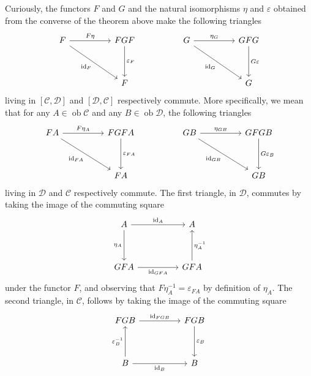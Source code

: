 \documentclass[a4paper,11pt]{article}
\theoremstyle{break_italics}
\theoremstyle{break_upright}
\theoremstyle{remark}
\newcommand{\id}{\mathrm{id}}
\newcommand{\ob}{\operatorname{ob}}
\newcommand{\C}{\mathcal{C}}
\newcommand{\D}{\mathcal{D}}
\begin{document}
Curiously, the functors $F$ and $G$ and the natural isomorphisms $\eta$ and $\varepsilon$ obtained from the converse of the theorem above make the following triangles
\[
\begin{tikzcd}
F \arrow[rr, "F\eta"] \arrow[rrdd, "\id_F"'] &  & FGF \arrow[dd, "\varepsilon_F"] &  & G \arrow[rr, "\eta_G"] \arrow[rrdd, "\id_G"'] &  & GFG \arrow[dd, "G\varepsilon"] \\
                                             &  &                                 &  &                                               &  &                                \\
                                             &  & F                               &  &                                               &  & G                             
\end{tikzcd}
\]
living in $[\C,\D]$ and $[\D,\C]$ respectively commute. More specifically, we mean that for any $A \in \ob\C$ and any $B \in \ob\D$, the following triangles
\[
\begin{tikzcd}
FA \arrow[rr, "F\eta_A"] \arrow[rrdd, "\id_{FA}"'] &  & FGFA \arrow[dd, "\varepsilon_{FA}"] &  & GB \arrow[rr, "\eta_{GB}"] \arrow[rrdd, "\id_{GB}"'] &  & GFGB \arrow[dd, "G\varepsilon_B"] \\
                                                   &  &                                     &  &                                                      &  &                                   \\
                                                   &  & FA                                  &  &                                                      &  & GB                               
\end{tikzcd}
\]
living in $\D$ and $\C$ respectively commute. The first triangle, in $\D$, commutes by taking the image of the commuting square
\[
\begin{tikzcd}
A \arrow[rr, "\id_A"] \arrow[dd, "\eta_A"'] &  & A                              \\
                                            &  &                                \\
GFA \arrow[rr, "\id_{GFA}"']                &  & GFA \arrow[uu, "\eta_A^{-1}"']
\end{tikzcd}
\]
under the functor $F$, and observing that $F\eta_A^{-1} = \varepsilon_{FA}$ by definition of $\eta_A$. The second triangle, in $\C$, follows by taking the image of the commuting square
\[
\begin{tikzcd}
FGB \arrow[rr, "\id_{FGB}"]                             &  & FGB \arrow[dd, "\varepsilon_B"] \\
                                                        &  &                                 \\
B \arrow[rr, "\id_B"'] \arrow[uu, "\varepsilon_B^{-1}"] &  & B                              
\end{tikzcd}
\]
\end{document}
